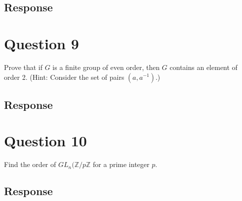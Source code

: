 \documentclass[13pt]{article}
\begin{document}
\subsection*{Response}





\newpage
\section*{Question 9}
Prove that if $G$ is a finite group of even order, then $G$ contains an element of order 2. (Hint:
Consider the set of pairs $(a, a^{-1})$.)

\subsection*{Response}





\newpage
\section*{Question 10}
Find the order of $GL_n(\mathbb{Z}/p\mathbb{Z}$ for a prime integer $p$.

\subsection*{Response}
\end{document}
